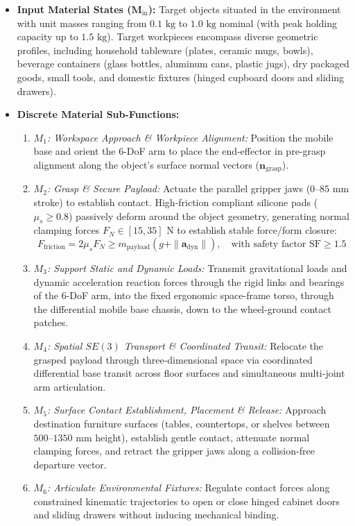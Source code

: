 \begin{itemize}[leftmargin=1.5em]
  \item \textbf{Input Material States ($\mathbf{M}_{\text{in}}$):}
  Target objects situated in the environment with unit masses ranging from $0.1\text{ kg}$ to $1.0\text{ kg}$ nominal (with peak holding capacity up to $1.5\text{ kg}$). Target workpieces encompass diverse geometric profiles, including household tableware (plates, ceramic mugs, bowls), beverage containers (glass bottles, aluminum cans, plastic jugs), dry packaged goods, small tools, and domestic fixtures (hinged cupboard doors and sliding drawers).
  
  \item \textbf{Discrete Material Sub-Functions:}
  \begin{enumerate}[leftmargin=1.2em]
    \item \emph{$M_1$: Workspace Approach \& Workpiece Alignment:} Position the mobile base and orient the 6-DoF arm to place the end-effector in pre-grasp alignment along the object's surface normal vectors ($\mathbf{n}_{\text{grasp}}$).
    \item \emph{$M_2$: Grasp \& Secure Payload:} Actuate the parallel gripper jaws ($0\text{--}85\text{ mm}$ stroke) to establish contact. High-friction compliant silicone pads ($\mu_s \ge 0.8$) passively deform around the object geometry, generating normal clamping forces $F_N \in [15, 35]\text{ N}$ to establish stable force/form closure:
    \begin{equation}
      F_{\text{friction}} = 2 \mu_s F_N \ge m_{\text{payload}} (g + \|\mathbf{a}_{\text{dyn}}\|), \quad \text{with safety factor } \mathrm{SF} \ge 1.5
    \end{equation}
    \item \emph{$M_3$: Support Static and Dynamic Loads:} Transmit gravitational loads and dynamic acceleration reaction forces through the rigid links and bearings of the 6-DoF arm, into the fixed ergonomic space-frame torso, through the differential mobile base chassis, down to the wheel-ground contact patches.
    \item \emph{$M_4$: Spatial $SE(3)$ Transport \& Coordinated Transit:} Relocate the grasped payload through three-dimensional space via coordinated differential base transit across floor surfaces and simultaneous multi-joint arm articulation.
    \item \emph{$M_5$: Surface Contact Establishment, Placement \& Release:} Approach destination furniture surfaces (tables, countertops, or shelves between $500\text{--}1350\text{ mm}$ height), establish gentle contact, attenuate normal clamping forces, and retract the gripper jaws along a collision-free departure vector.
    \item \emph{$M_6$: Articulate Environmental Fixtures:} Regulate contact forces along constrained kinematic trajectories to open or close hinged cabinet doors and sliding drawers without inducing mechanical binding.
  \end{enumerate}


\end{itemize}
